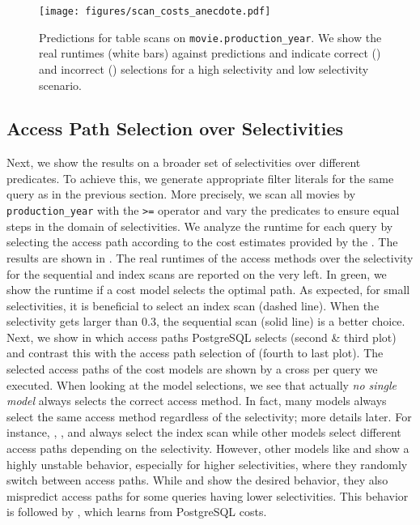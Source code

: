 \begin{figure}
    \centering
    \texttt{[image: figures/scan\_costs\_anecdote.pdf]}
    \caption{Predictions for table scans on \texttt{movie.production\_year}.
    We show the real runtimes (white bars) against \lcm predictions and indicate correct (\checkmark) and incorrect () selections for a high selectivity  and low selectivity  scenario.}
    \label{fig:scan_cost_anecdote}
\end{figure}


\subsection{Access Path Selection over Selectivities}
\label{subsec:access_path_selectivity}
Next, we show the results on a broader set of selectivities over different predicates. 
To achieve this, we generate appropriate filter literals for the same query as in the previous section.
More precisely, we scan all movies by \texttt{production\_year} with the \texttt{>=} operator and vary the predicates to ensure equal steps in the domain of selectivities.
We analyze the runtime for each query by selecting the access path according to the cost estimates provided by the \lcm.
The results are shown in .
The real runtimes of the access methods over the selectivity for the sequential and index scans are reported on the very left.
In green, we show the runtime if a cost model selects the optimal path.
As expected, for small selectivities, it is beneficial to select an index scan (dashed line).
When the selectivity gets larger than 0.3, the sequential scan (solid line) is a better choice.
Next, we show in  which access paths PostgreSQL selects (second \& third plot)  and contrast this with the access path selection of \lcms (fourth to last plot).
The selected access paths of the cost models are shown by a cross per query we executed.
When looking at the model selections, we see that actually \textit{no single model} always selects the correct access method.
In fact, many models always select the same access method regardless of the selectivity; more details later.
For instance, \flatvector, \zeroshot, \qppnet and \queryformer always select the index scan while other models select different access paths depending on the selectivity.
However, other models like \mscn and \etoe show a highly unstable behavior, especially for higher selectivities, where they randomly switch between access paths.
While \postgresx and \postgresxvi show the desired behavior, they also mispredict access paths for some queries having lower selectivities. 
This behavior is followed by \dace, which learns from PostgreSQL costs.

